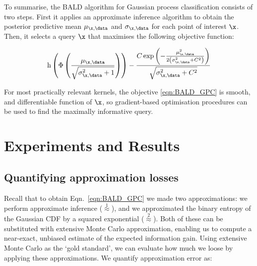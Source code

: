 To summarise, the BALD algorithm for Gaussian process classification consists of two steps. First it applies an approximate inference algorithm to obtain the posterior predictive mean $\mu_{\x,\data}$ and $\sigma_{\x,\data}$ for each point of interest $\x$. Then, it selects a query $\x$ that maximises the following objective function:

\begin{equation}
	\mathrm{h} \left( \Phi\left( \frac{\mu_{\x,\data}}{\sqrt{\sigma^2_{\x,\data} + 1}} \right)\right) - \frac{C \exp\left(-\frac{\mu_{\x,\data}^2}{2\left(\sigma_{\x,\data}^2 + C^2\right)}\right)}{\sqrt{\sigma_{\x,\data}^2 + C^2}} \label{eqn:BALD_GPC}
\end{equation}

For most practically relevant kernels, the objective \eqref{eqn:BALD_GPC} is smooth, and differentiable function of $\x$, so gradient-based optimisation procedures can be used to find the maximally informative query.
	

\section{Experiments and Results}

\subsection{Quantifying approximation losses}

Recall that to obtain Eqn.\ \eqref{eqn:BALD_GPC} we made two approximations: we perform approximate inference ({\scriptsize $\stackrel{1}{\approx}$}), and we approximated the binary entropy of the Gaussian CDF by a squared exponential ({\scriptsize $\stackrel{2}{\approx}$}). Both of these can be substituted with extensive Monte Carlo approximation, enabling us to compute a near-exact, unbiased estimate of the expected information gain. Using extensive Monte Carlo as the `gold standard', we can evaluate how much we loose by applying these approximations. We quantify approximation error as: 

